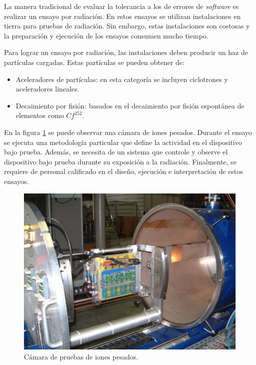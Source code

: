 La manera tradicional de evaluar la tolerancia a los de errores de \emph{software} es realizar un ensayo por radiación.
En estos ensayos se utilizan instalaciones en tierra para pruebas de radiación.
Sin embargo, estas instalaciones son costosas y la preparación y ejecución de los ensayos consumen mucho tiempo.

Para lograr un ensayo por radiación, las instalaciones deben producir un haz de partículas cargadas.
Estas partículas se pueden obtener de:
\begin{itemize}
    \item Aceleradores de partículas: en esta categoría se incluyen ciclotrones y aceleradores lineales.
    \item Decaimiento por fisión: basados en el decaimiento por fisión espontánea de elementos como $Cf^{252}$.
\end{itemize}

En la figura \ref{fig:iones} se puede observar una cámara de iones pesados.
Durante el ensayo se ejecuta una metodología particular que define la actividad en el dispositivo bajo prueba.
Además, se necesita de un sistema que controle y observe el dispositivo bajo prueba durante su exposición a la radiación.
Finalmente, se requiere de personal calificado en el diseño, ejecución e interpretación de estos ensayos.

\begin{figure}[htbp]
	\centering
	\includegraphics[width=\textwidth]{./Figures/heavy_ion_latchup_tests_in_louvain_la_neuve.jpg}
    \caption{Cámara de pruebas de iones pesados\protect\footnotemark.}
	\label{fig:iones}
\end{figure}

